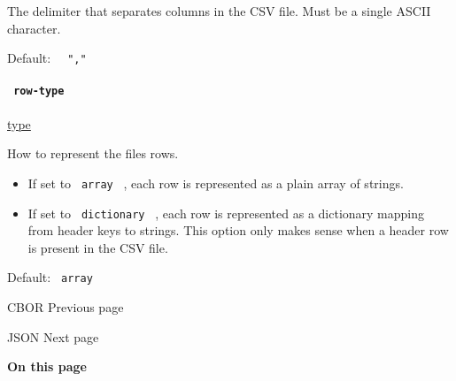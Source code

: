 The delimiter that separates columns in the CSV file. Must be a single
ASCII character.

Default: \texttt{\ }{\texttt{\ ","\ }}\texttt{\ }

\paragraph{\texorpdfstring{\texttt{\ row-type\ }}{ row-type }}\label{definitions-decode-row-type}

\href{/docs/reference/foundations/type/}{type}

How to represent the file\textquotesingle s rows.

\begin{itemize}
\tightlist
\item
  If set to \texttt{\ array\ } , each row is represented as a plain
  array of strings.
\item
  If set to \texttt{\ dictionary\ } , each row is represented as a
  dictionary mapping from header keys to strings. This option only makes
  sense when a header row is present in the CSV file.
\end{itemize}

Default: \texttt{\ array\ }

\href{/docs/reference/data-loading/cbor/}{\pandocbounded{}}

{ CBOR } { Previous page }

\href{/docs/reference/data-loading/json/}{\pandocbounded{}}

{ JSON } { Next page }

\textbf{On this page}

